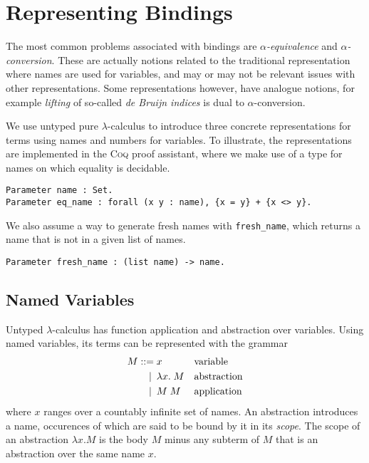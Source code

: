 \documentclass[a4paper,11pt]{article}
\newcommand{\name}[1]{\textsc{#1}\xspace}
\def\Coq{\name{Coq}}
\begin{document}
\section{Representing Bindings}\label{sec:representing}

The most common problems associated with bindings are {\em $\alpha$-equivalence}
and {\em $\alpha$-conversion}.
These are actually notions related to the traditional representation where
names are used for variables, and may or may not be relevant issues with
other representations.
Some representations however, have analogue notions, for example {\em lifting}
of so-called {\em de Bruijn indices} is dual to $\alpha$-conversion.

We use untyped pure $\lambda$-calculus \cite{barendregt-84} to introduce
three concrete representations for terms using names and numbers for
variables. To illustrate, the representations are implemented in the
\Coq proof assistant, where we make use of a type for names on which
equality is decidable.
\begin{lstlisting}
Parameter name : Set.
Parameter eq_name : forall (x y : name), {x = y} + {x <> y}.
\end{lstlisting}
We also assume a way to generate fresh names with \lstinline{fresh_name},
which returns a name that is not in a given list of names.
\begin{lstlisting}
Parameter fresh_name : (list name) -> name.
\end{lstlisting}


\subsection{Named Variables}

Untyped $\lambda$-calculus has function application and abstraction over
variables. Using named variables, its terms can be represented with the
grammar
\begin{align*}
  M ::=             &\; x
  && \text{variable} \\
  \llap{\textbar\:} &\; \lambda x. \; M
  && \text{abstraction} \\
  \llap{\textbar\:} &\; M \; M
  && \text{application}
\end{align*}
where $x$ ranges over a countably infinite set of names.
An abstraction introduces a name, occurences of which are said to be
bound by it in its {\em scope}. The scope of an abstraction $\lambda
x.M$ is the body $M$ minus any subterm of $M$ that is an abstraction
over the same name $x$.
\end{document}
